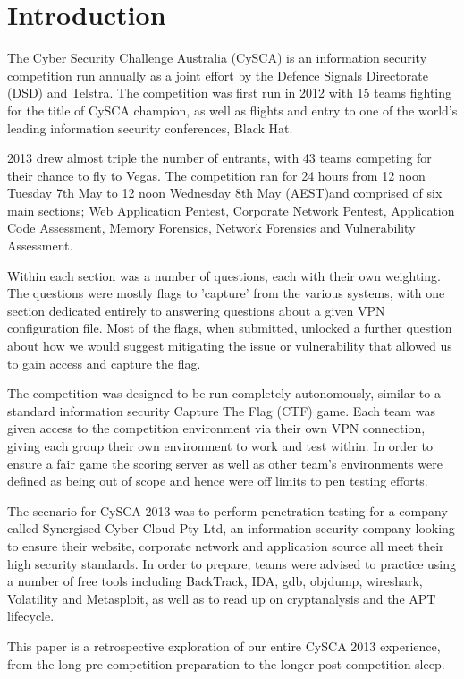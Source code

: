 \chapter{Introduction}

The Cyber Security Challenge Australia (CySCA) is an information security
competition run annually as a joint effort by the Defence Signals Directorate
(DSD) and Telstra. The competition was first run in 2012 with 15 teams fighting
for the title of CySCA champion, as well as flights and entry to one of the
world's leading information security conferences, Black Hat.

2013 drew almost triple the number of entrants, with 43 teams competing for
their chance to fly to Vegas.  The competition ran for 24 hours from 12 noon
Tuesday 7th May to 12 noon Wednesday 8th May  (AEST)and comprised of six main
sections; Web Application Pentest, Corporate Network Pentest, Application Code
Assessment, Memory Forensics, Network Forensics and Vulnerability Assessment.

Within each section was a number of questions, each with their own weighting.
The questions were mostly flags to 'capture' from the various systems, with one
section dedicated entirely to answering questions about a given VPN
configuration file.  Most of the flags, when submitted, unlocked a further
question about how we would suggest mitigating the issue or vulnerability that
allowed us to gain access and capture the flag.

The competition was designed to be run completely autonomously, similar to a
standard information security Capture The Flag (CTF) game. Each team was given
access to the competition environment via their own VPN connection, giving each
group their own environment to work and test within. In order to ensure a fair
game the scoring server as well as other team's environments were defined as
being out of scope and hence were off limits to pen testing efforts.

The scenario for CySCA 2013 was to perform penetration testing for a company
called Synergised Cyber Cloud Pty Ltd, an information security company looking
to ensure their website, corporate network and application source all meet their
high security standards. In order to prepare, teams were advised to practice
using a number of free tools including BackTrack, IDA, gdb, objdump, wireshark,
Volatility and Metasploit, as well as to read up on cryptanalysis and the APT
lifecycle.

This paper is a retrospective exploration of our entire CySCA 2013 experience,
from the long pre-competition preparation to the longer post-competition sleep.

